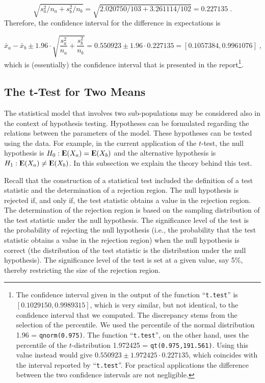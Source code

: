 \documentclass[]{krantz}
\newcommand{\Expec}{{\rm I\kern-.3em E}}
\theoremstyle{definition}
\theoremstyle{definition}
\theoremstyle{definition}
\theoremstyle{remark}
\begin{document}
\[\sqrt{s_a^2/n_a + s_b^2/n_b} = \sqrt{2.020750/103 + 3.261114/102} = 0.227135\;.\]
Therefore, the confidence interval for the difference in expectations is

\[\bar x_a- \bar x_b \pm 1.96 \cdot \sqrt{\frac{s_a^2}{n_a} + \frac{s_b^2}{n_b}} = 0.550923 \pm 1.96 \cdot 0.227135 = [0.1057384,0.9961076]\;,\]
which is (essentially) the confidence interval that is presented in the
report\footnote{The confidence interval given in the output of the function
  ``\texttt{t.test}'' is \([0.1029150, 0.9989315]\), which is very similar, but
  not identical, to the confidence interval that we computed. The
  discrepancy stems from the selection of the percentile. We used the
  percentile of the normal distribution 1.96 = \texttt{qnorm(0.975)}. The
  function ``\texttt{t.test}'', on the other hand, uses the percentile of the
  \(t\)-distribution 1.972425 = \texttt{qt(0.975,191.561)}. Using this value
  instead would give \(0.550923 \pm 1.972425 \cdot 0.227135\), which
  coincides with the interval reported by ``\texttt{t.test}''. For practical
  applications the difference between the two confidence intervals are
  not negligible.}.

\hypertarget{the-t-test-for-two-means}{%
\subsection{The t-Test for Two Means}\label{the-t-test-for-two-means}}

The statistical model that involves two sub-populations may be
considered also in the context of hypothesis testing. Hypotheses can be
formulated regarding the relations between the parameters of the model.
These hypotheses can be tested using the data. For example, in the
current application of the \(t\)-test, the null hypothesis is
\(H_0: \Expec(X_a) = \Expec(X_b)\) and the alternative hypothesis is
\(H_1: \Expec(X_a) \not= \Expec(X_b)\). In this subsection we explain the
theory behind this test.

Recall that the construction of a statistical test included the
definition of a test statistic and the determination of a rejection
region. The null hypothesis is rejected if, and only if, the test
statistic obtains a value in the rejection region. The determination of
the rejection region is based on the sampling distribution of the test
statistic under the null hypothesis. The significance level of the test
is the probability of rejecting the null hypothesis (i.e., the
probability that the test statistic obtains a value in the rejection
region) when the null hypothesis is correct (the distribution of the
test statistic is the distribution under the null hypothesis). The
significance level of the test is set at a given value, say 5\%, thereby
restricting the size of the rejection region.
\end{document}
